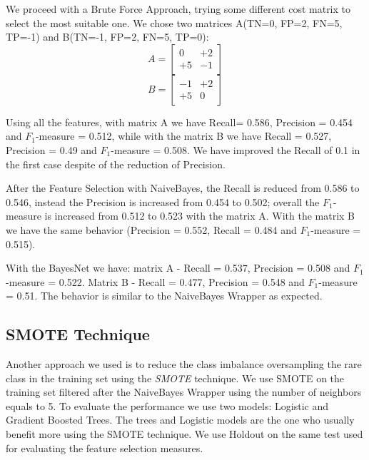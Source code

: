 \documentclass[fleqn,10pt]{SelfArx} %
\begin{document}
We proceed with a Brute Force Approach, trying some different cost matrix to select the most suitable one. \newline
We chose two matrices A(TN=0, FP=2, FN=5, TP=-1) and B(TN=-1, FP=2, FN=5, TP=0):
$$
A=\begin{bmatrix} 
0 & +2 \\
+5 & -1 
\end{bmatrix}
$$
$$
B=\begin{bmatrix} 
-1 & +2 \\
+5 & 0 
\end{bmatrix}
$$ 

Using all the features, with matrix A we have Recall= 0.586, Precision = 0.454 and $F_1$-measure = 0.512, while with the matrix B we have Recall = 0.527, Precision = 0.49 and $F_1$-measure = 0.508. 
We have improved the Recall of 0.1 in the first case despite of the reduction of Precision.

After the Feature Selection with NaiveBayes, the Recall is reduced from 0.586 to 0.546, instead the Precision is increased from 0.454 to 0.502; overall the $F_1$-measure is increased from 0.512 to 0.523 with the matrix A. 
With the matrix B we have the same behavior (Precision = 0.552, Recall = 0.484 and $F_1$-measure = 0.515). 

With the BayesNet we have: matrix A - Recall = 0.537, Precision = 0.508 and $F_1$-measure = 0.522. Matrix B - Recall = 0.477, Precision = 0.548 and $F_1$-measure = 0.51. 
The behavior is similar to the NaiveBayes Wrapper as expected.  

\subsection{SMOTE Technique}
Another approach we used is to reduce the class imbalance oversampling the rare class in the training set using the \textit{SMOTE} technique. \newline
We use SMOTE on the training set filtered after the NaiveBayes Wrapper using the number of neighbors equals to 5. 
To evaluate the performance we use two models: Logistic and Gradient Boosted Trees. The trees and Logistic models are the one who usually benefit more using the SMOTE technique. 
We use Holdout on the same test used for evaluating the feature selection measures. 
\end{document}
